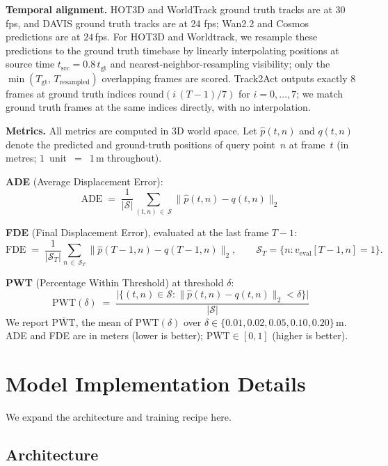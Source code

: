 \documentclass{llmxive}
\begin{document}
\noindent\textbf{Temporal alignment.}
HOT3D and WorldTrack ground truth tracks are at $30$\,fps, and DAVIS ground truth tracks are at 24 fps; Wan2.2 and Cosmos predictions are at $24$\,fps.
For HOT3D and Worldtrack, we resample these predictions to the ground truth
timebase by linearly interpolating positions at source time
$t_\text{src} = 0.8\,t_\text{gt}$ and nearest-neighbor-resampling
visibility; only the $\min(T_\text{gt},\,T_\text{resampled})$ overlapping
frames are scored. Track2Act outputs exactly $8$ frames at ground truth indices
$\mathrm{round}(i\,(T-1)/7)$ for $i=0,\ldots,7$; we match ground truth frames at the
same indices directly, with no interpolation.

\noindent\textbf{Metrics.}
All metrics are computed in 3D world space. Let $\hat{p}(t,n)$ and $q(t,n)$
denote the predicted and ground-truth positions of query point~$n$ at
frame~$t$ (in metres; $1$~unit~$=$~$1$\,m throughout).

\textbf{ADE} (Average Displacement Error):
\[
  \mathrm{ADE} \;=\; \frac{1}{|\mathcal{S}|}
    \sum_{(t,n)\,\in\,\mathcal{S}} \|\hat{p}(t,n) - q(t,n)\|_2
\]

\textbf{FDE} (Final Displacement Error), evaluated at the last frame $T-1$:
\[
  \mathrm{FDE} \;=\; \frac{1}{|\mathcal{S}_T|}
    \sum_{n\,\in\,\mathcal{S}_T} \|\hat{p}(T-1,n) - q(T-1,n)\|_2,
  \qquad \mathcal{S}_T = \{n : v_\text{eval}[T-1,n]=1\}.
\]

\textbf{PWT} (Percentage Within Threshold) at threshold $\delta$:
\[
  \mathrm{PWT}(\delta) \;=\;
    \frac{\bigl|\{(t,n)\in\mathcal{S} :
      \|\hat{p}(t,n)-q(t,n)\|_2 < \delta\}\bigr|}{|\mathcal{S}|}
\]
We report $\overline{\mathrm{PWT}}$, the mean of $\mathrm{PWT}(\delta)$ over
$\delta \in \{0.01, 0.02, 0.05, 0.10, 0.20\}$\,m. ADE and FDE are in meters
(lower is better); $\overline{\mathrm{PWT}}\in[0,1]$ (higher is better).




\section{Model Implementation Details}
\label{appsec:model_details}

We expand the architecture and training recipe here.

\subsection{Architecture}
\label{appsec:model_arch}
\end{document}
